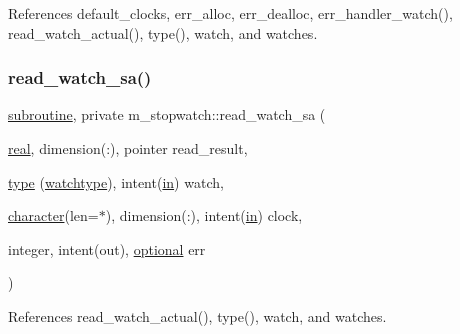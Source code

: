 References default\+\_\+clocks, err\+\_\+alloc, err\+\_\+dealloc, err\+\_\+handler\+\_\+watch(), read\+\_\+watch\+\_\+actual(), type(), watch, and watches.

\mbox{\label{namespacem__stopwatch_aeff00ff26ea56c282f257e7fa03d2319}} 
\subsubsection{\texorpdfstring{read\+\_\+watch\+\_\+sa()}{read\_watch\_sa()}}
{\footnotesize\ttfamily \hyperlink{M__stopwatch_83_8txt_acfbcff50169d691ff02d4a123ed70482}{subroutine}, private m\+\_\+stopwatch\+::read\+\_\+watch\+\_\+sa (\begin{DoxyParamCaption}\item[{\hyperlink{read__watch_83_8txt_abdb62bde002f38ef75f810d3a905a823}{real}, dimension(\+:), pointer}]{read\+\_\+result,  }\item[{\hyperlink{stop__watch_83_8txt_a70f0ead91c32e25323c03265aa302c1c}{type} (\hyperlink{structm__stopwatch_1_1watchtype}{watchtype}), intent(\hyperlink{M__journal_83_8txt_afce72651d1eed785a2132bee863b2f38}{in})}]{watch,  }\item[{\hyperlink{option__stopwatch_83_8txt_abd4b21fbbd175834027b5224bfe97e66}{character}(len=$\ast$), dimension(\+:), intent(\hyperlink{M__journal_83_8txt_afce72651d1eed785a2132bee863b2f38}{in})}]{clock,  }\item[{integer, intent(out), \hyperlink{option__stopwatch_83_8txt_aa4ece75e7acf58a4843f70fe18c3ade5}{optional}}]{err }\end{DoxyParamCaption})\hspace{0.3cm}{\ttfamily [private]}}



References read\+\_\+watch\+\_\+actual(), type(), watch, and watches.

\mbox{\label{namespacem__stopwatch_a89bcd606b0a234679db7c5809e0560f3}} 
